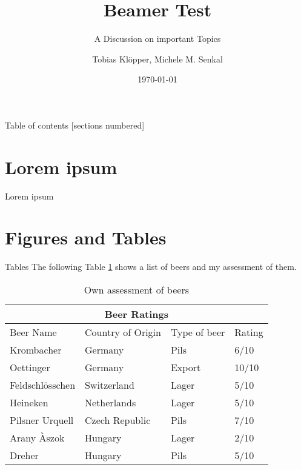 \documentclass[10pt]{beamer}
\title{Beamer Test}
\subtitle{A Discussion on important Topics}
\date{\today}
\author{Tobias Klöpper, Michele M. Senkal}
\institute{Institute for Brewing and Degustation}
\begin{document}
\maketitle

\begin{frame}{Table of contents}
  [sections numbered]
  \tableofcontents%
\end{frame}

\section{Lorem ipsum}
\begin{frame}{Lorem ipsum}
\blindtext
\end{frame}

\section{Figures and Tables}
\begin{frame}{Tables}
The following Table \ref{table:1} shows a list of beers and my assessment of them.
\begin{table}[h!]
\begin{tabular}{ |p{3cm}||p{3cm}|p{2cm}|p{1cm}|  }
 \hline
 \multicolumn{4}{|c|}{Beer Ratings} \\
 \hline
 Beer Name & Country of Origin &Type of beer&Rating\\
 \hline
 Krombacher   & Germany    & Pils &   6/10\\
 Oettinger&   Germany  & Export   &10/10\\
 Feldschlösschen &Switzerland & Lager &  5/10\\
 Heineken    &Netherlands & Lager &  5/10\\
 Pilsner Urquell&   Czech Republic  & Pils & 7/10\\
 Arany Àszok& Hungary  & Lager   & 2/10\\
 Dreher& Hungary  & Pils & 5/10\\
 \hline
 \end{tabular}
 \caption{Own assessment of beers}
 \label{table:1}
\end{table}
\end{frame}
\end{document}
